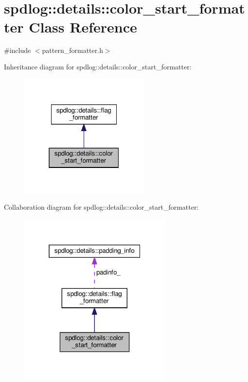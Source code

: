 \hypertarget{classspdlog_1_1details_1_1color__start__formatter}{}\section{spdlog\+:\+:details\+:\+:color\+\_\+start\+\_\+formatter Class Reference}
\label{classspdlog_1_1details_1_1color__start__formatter}


{\ttfamily \#include $<$pattern\+\_\+formatter.\+h$>$}



Inheritance diagram for spdlog\+:\+:details\+:\+:color\+\_\+start\+\_\+formatter\+:
\nopagebreak
\begin{figure}[H]
\begin{center}
\leavevmode
\includegraphics[width=187pt]{classspdlog_1_1details_1_1color__start__formatter__inherit__graph}
\end{center}
\end{figure}


Collaboration diagram for spdlog\+:\+:details\+:\+:color\+\_\+start\+\_\+formatter\+:
\nopagebreak
\begin{figure}[H]
\begin{center}
\leavevmode
\includegraphics[width=220pt]{classspdlog_1_1details_1_1color__start__formatter__coll__graph}
\end{center}
\end{figure}
